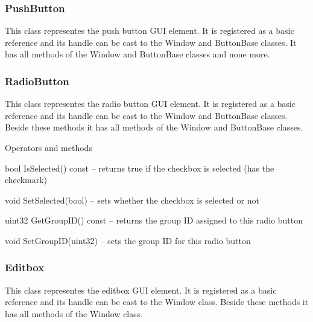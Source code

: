\subsubsection{PushButton}

This class representes the push button GUI element. It is registered as a basic reference and its handle can be cast to the Window and ButtonBase classes. It has all methods of the Window and ButtonBase classes and none more.

\subsubsection{RadioButton}

This class representes the radio button GUI element. It is registered as a basic reference and its handle can be cast to the Window and ButtonBase classes. Beside these methods it has all methods of the Window and ButtonBase classes.

\begin{titled-itemize}{Operators and methods}
  \item bool IsSelected() const -- returns true if the checkbox is selected (has the checkmark)
  \item void SetSelected(bool) -- sets whether the checkbox is selected or not
  \item uint32 GetGroupID() const -- returns the group ID assigned to this radio button
  \item void SetGroupID(uint32) -- sets the group ID for this radio button
\end{titled-itemize}

\subsubsection{Editbox}

This class representes the editbox GUI element. It is registered as a basic reference and its handle can be cast to the Window class. Beside these methods it has all methods of the Window class.

